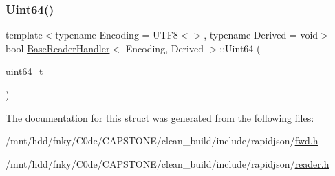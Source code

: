 \subsubsection{\texorpdfstring{Uint64()}{Uint64()}}
{\footnotesize\ttfamily template$<$typename Encoding = U\+T\+F8$<$$>$, typename Derived = void$>$ \\
bool \hyperlink{structBaseReaderHandler}{Base\+Reader\+Handler}$<$ Encoding, Derived $>$\+::Uint64 (\begin{DoxyParamCaption}\item[{\hyperlink{stdint_8h_aec6fcb673ff035718c238c8c9d544c47}{uint64\+\_\+t}}]{ }\end{DoxyParamCaption})\hspace{0.3cm}{\ttfamily [inline]}}



The documentation for this struct was generated from the following files\+:\begin{DoxyCompactItemize}
\item 
/mnt/hdd/fnky/\+C0de/\+C\+A\+P\+S\+T\+O\+N\+E/clean\+\_\+build/include/rapidjson/\hyperlink{fwd_8h}{fwd.\+h}\item 
/mnt/hdd/fnky/\+C0de/\+C\+A\+P\+S\+T\+O\+N\+E/clean\+\_\+build/include/rapidjson/\hyperlink{reader_8h}{reader.\+h}\end{DoxyCompactItemize}
